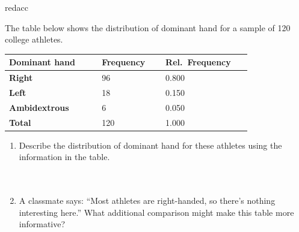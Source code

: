 \documentclass[10pt]{article}
\begin{document}
\vspace{0.14in}

\begin{blurbbox}{redacc}
\small

The table below shows the distribution of dominant hand for a sample of
120 college athletes.

\vspace{8pt}
\renewcommand{\arraystretch}{1.6}
\begin{tabularx}{0.7\linewidth}{@{} >{\bfseries}p{0.32\linewidth}
                                      C{0.22\linewidth}
                                      C{0.26\linewidth} @{}}
\textbf{Dominant hand} & \textbf{Frequency} & \textbf{Rel.\ Frequency} \\
\midrule
Right    & 96  & 0.800 \\
Left     & 18  & 0.150 \\
Ambidextrous & 6 & 0.050 \\
\midrule
{}\textbf{Total} & 120 & 1.000 \\
\end{tabularx}

\vspace{10pt}

\begin{enumerate}[leftmargin=1.5em, itemsep=10pt]
  \item Describe the distribution of dominant hand for these athletes using
        the information in the table.\\[6pt]
        \writeline\\[1pt]\writeline\\[1pt]\writeline

  \item A classmate says: ``Most athletes are right-handed, so there's nothing
        interesting here.'' What additional comparison might make this table
        more informative?\\[6pt]
        \writeline\\[1pt]\writeline
\end{enumerate}

\end{blurbbox}

\vspace{0.14in}
\end{document}
